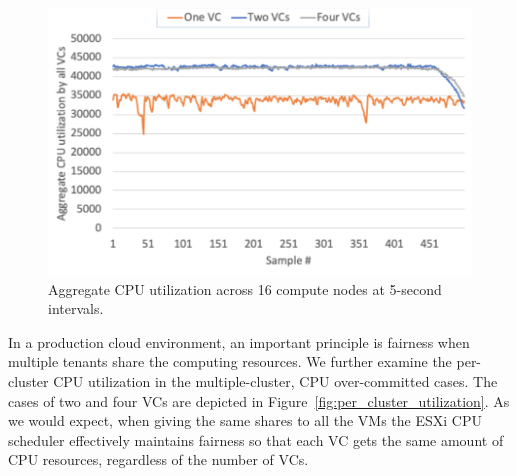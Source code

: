 \begin{figure}[!t]
   \begin{center}
       \includegraphics[width=\columnwidth]{Figures/cpu_utilizations.pdf}
   \end{center}
   \caption{Aggregate CPU utilization across 16 compute nodes at 5-second intervals.}
   \label{fig:cpu_utilizations}
 \end{figure}

 In a production cloud environment, an important principle is fairness when multiple tenants share the computing resources. We further examine the per-cluster CPU utilization in the multiple-cluster, CPU over-committed cases.  The cases of two and four VCs are depicted in Figure~\ref{fig:per_cluster_utilization}. As we would expect, when giving the same shares to all the VMs the ESXi CPU scheduler effectively maintains fairness so that each VC gets the same amount of CPU resources, regardless of the number of VCs. %


